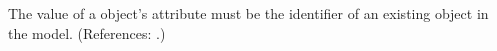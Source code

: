 The value of a \SpeciesReference object's  attribute must be
the identifier of an existing \Species object in the model.  (References:
.)
